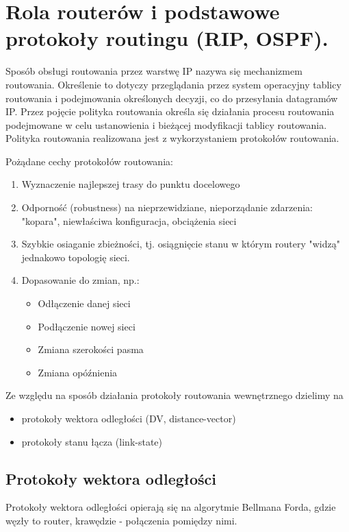 \documentclass[main.tex]{subfiles}
\begin{document}
    \newpage

    \section{Rola routerów i podstawowe protokoły routingu (RIP, OSPF).}

    Sposób obsługi routowania przez warstwę IP nazywa się mechanizmem routowania.
    Określenie to dotyczy przeglądania przez system operacyjny tablicy routowania i podejmowania określonych decyzji, co do przesyłania datagramów IP.
    Przez pojęcie polityka routowania określa się działania procesu routowania podejmowane w
    celu ustanowienia i bieżącej modyfikacji tablicy routowania. Polityka routowania realizowana jest z wykorzystaniem protokołów routowania.

    Pożądane cechy protokołów routowania:
    \begin{enumerate}
        \item Wyznaczenie najlepszej trasy do punktu docelowego
        \item Odporność (robustness) na nieprzewidziane, nieporządanie zdarzenia:
        "kopara", niewłaściwa konfiguracja, obciążenia sieci
        \item Szybkie osiaganie zbieżności, tj. osiągnięcie stanu w którym
        routery "widzą" jednakowo topologię sieci.
        \item Dopasowanie do zmian, np.:
        \begin{itemize}
            \item Odłączenie danej sieci
            \item Podłączenie nowej sieci
            \item Zmiana szerokości pasma
            \item Zmiana opóźnienia
        \end{itemize}
    \end{enumerate}

    Ze względu na sposób działania protokoły routowania wewnętrznego dzielimy na
    \begin{itemize}
        \item protokoły wektora odległości (DV, distance-vector)
        \item protokoły stanu łącza (link-state)
    \end{itemize}

    \newpage

    \subsection{Protokoły wektora odległości}
    Protokoły wektora odległości opierają się na algorytmie Bellmana Forda, gdzie
    węzły to router, krawędzie - połączenia pomiędzy nimi.
\end{document}
